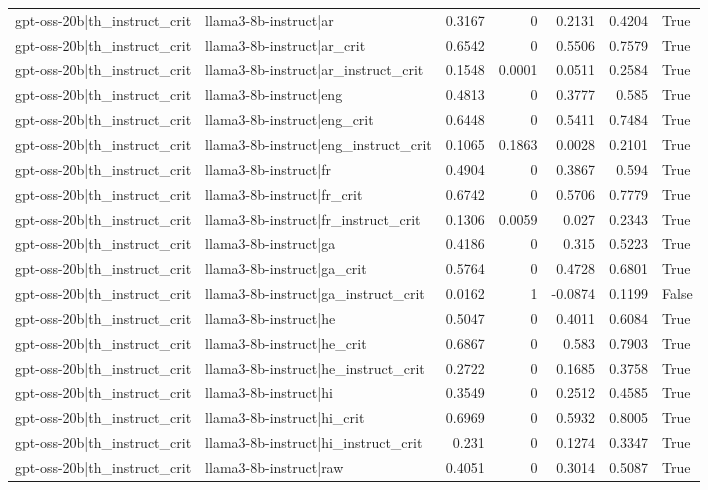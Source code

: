 \begin{table}
\begin{tabular}{l l r r r r l}
gpt-oss-20b|th_instruct_crit & llama3-8b-instruct|ar & 0.3167 & 0 & 0.2131 & 0.4204 & True \\
gpt-oss-20b|th_instruct_crit & llama3-8b-instruct|ar_crit & 0.6542 & 0 & 0.5506 & 0.7579 & True \\
gpt-oss-20b|th_instruct_crit & llama3-8b-instruct|ar_instruct_crit & 0.1548 & 0.0001 & 0.0511 & 0.2584 & True \\
gpt-oss-20b|th_instruct_crit & llama3-8b-instruct|eng & 0.4813 & 0 & 0.3777 & 0.585 & True \\
gpt-oss-20b|th_instruct_crit & llama3-8b-instruct|eng_crit & 0.6448 & 0 & 0.5411 & 0.7484 & True \\
gpt-oss-20b|th_instruct_crit & llama3-8b-instruct|eng_instruct_crit & 0.1065 & 0.1863 & 0.0028 & 0.2101 & True \\
gpt-oss-20b|th_instruct_crit & llama3-8b-instruct|fr & 0.4904 & 0 & 0.3867 & 0.594 & True \\
gpt-oss-20b|th_instruct_crit & llama3-8b-instruct|fr_crit & 0.6742 & 0 & 0.5706 & 0.7779 & True \\
gpt-oss-20b|th_instruct_crit & llama3-8b-instruct|fr_instruct_crit & 0.1306 & 0.0059 & 0.027 & 0.2343 & True \\
gpt-oss-20b|th_instruct_crit & llama3-8b-instruct|ga & 0.4186 & 0 & 0.315 & 0.5223 & True \\
gpt-oss-20b|th_instruct_crit & llama3-8b-instruct|ga_crit & 0.5764 & 0 & 0.4728 & 0.6801 & True \\
gpt-oss-20b|th_instruct_crit & llama3-8b-instruct|ga_instruct_crit & 0.0162 & 1 & -0.0874 & 0.1199 & False \\
gpt-oss-20b|th_instruct_crit & llama3-8b-instruct|he & 0.5047 & 0 & 0.4011 & 0.6084 & True \\
gpt-oss-20b|th_instruct_crit & llama3-8b-instruct|he_crit & 0.6867 & 0 & 0.583 & 0.7903 & True \\
gpt-oss-20b|th_instruct_crit & llama3-8b-instruct|he_instruct_crit & 0.2722 & 0 & 0.1685 & 0.3758 & True \\
gpt-oss-20b|th_instruct_crit & llama3-8b-instruct|hi & 0.3549 & 0 & 0.2512 & 0.4585 & True \\
gpt-oss-20b|th_instruct_crit & llama3-8b-instruct|hi_crit & 0.6969 & 0 & 0.5932 & 0.8005 & True \\
gpt-oss-20b|th_instruct_crit & llama3-8b-instruct|hi_instruct_crit & 0.231 & 0 & 0.1274 & 0.3347 & True \\
gpt-oss-20b|th_instruct_crit & llama3-8b-instruct|raw & 0.4051 & 0 & 0.3014 & 0.5087 & True \\

\end{tabular}
\end{table}
